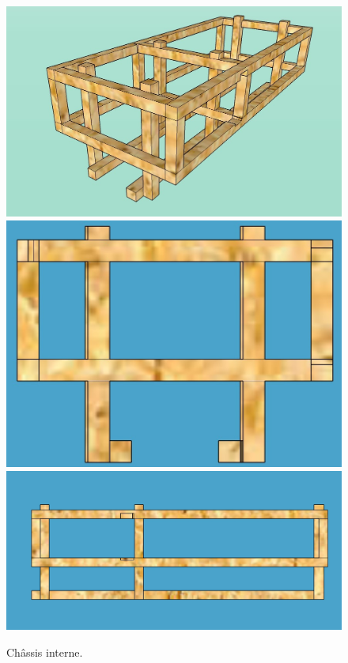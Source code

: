 \documentclass[11pt,a4paper]{article}
\begin{document}
        \begin{figure}[H]
          \centering
          \includegraphics[scale=0.24]{ROVChassisGlobal.jpg}
          \includegraphics[scale=0.24]{ROVChassisFace.jpg}
          \includegraphics[scale=0.24]{ROVChassisGauche.jpg}
          \caption{Châssis interne.}
          \label{figChassis}
        \end{figure}
\end{document}
